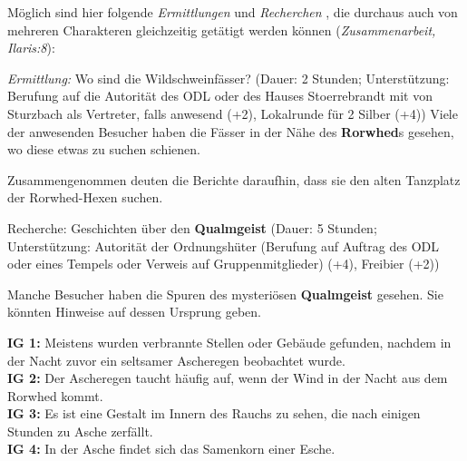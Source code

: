 Möglich sind hier folgende \emph{Ermittlungen} und \emph{Recherchen} , die durchaus auch von mehreren Charakteren gleichzeitig getätigt werden können (\emph{Zusammenarbeit, Ilaris:8}):

{
\emph{Ermittlung:} Wo sind die Wildschweinfässer? (Dauer: 2 Stunden;
Unterstützung: Berufung auf die Autorität des ODL oder des
Hauses Stoerrebrandt mit von Sturzbach als Vertreter, falls
anwesend  (+2), Lokalrunde für 2 Silber (+4))
Viele der anwesenden Besucher haben die Fässer in der Nähe des \textbf{Rorwhed}s gesehen, wo diese etwas zu suchen schienen.

Zusammengenommen deuten die Berichte daraufhin, dass sie den alten Tanzplatz der Rorwhed-Hexen suchen.
}

{
Recherche: Geschichten über den \textbf{Qualmgeist} (Dauer: 5 Stunden;
Unterstützung: Autorität der Ordnungshüter (Berufung auf Auftrag des ODL oder eines Tempels oder Verweis auf Gruppenmitglieder) (+4), Freibier (+2))

Manche Besucher haben die Spuren des mysteriösen \textbf{Qualmgeist} gesehen. Sie könnten Hinweise auf dessen Ursprung geben.

\textbf{IG 1:} Meistens wurden verbrannte Stellen oder Gebäude gefunden, nachdem in der Nacht zuvor ein seltsamer Ascheregen beobachtet wurde.\\
\textbf{IG 2:} Der Ascheregen taucht häufig auf, wenn der Wind in der Nacht aus dem Rorwhed kommt.\\
\textbf{IG 3:} Es ist eine Gestalt im Innern des Rauchs zu sehen, die nach einigen Stunden zu Asche zerfällt.\\
\textbf{IG 4:} In der Asche findet sich das Samenkorn einer Esche.
}

